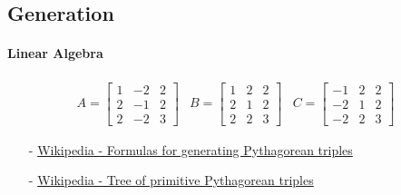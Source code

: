 \documentclass[a4paper]{report}
\begin{document}
\subsection{Generation}

\paragraph{Linear Algebra}

\begin{equation}
    \begin{array}{lcr}
    A = \begin{bmatrix} 1 & -2 & 2 \\ 2 & -1 & 2 \\ 2 & -2 & 3 \end{bmatrix} &
    B = \begin{bmatrix} 1 & 2 & 2 \\ 2 & 1 & 2 \\ 2 & 2 & 3 \end{bmatrix} &
    C = \begin{bmatrix} -1 & 2 & 2 \\ -2 & 1 & 2 \\ -2 & 2 & 3 \end{bmatrix}
    \end{array}
\end{equation}

\begin{itemize}
    \item[-]\href{http://en.wikipedia.org/wiki/Formulas_for_generating_Pythagorean_triples}{Wikipedia - Formulas for generating Pythagorean triples}
    \item[-]\href{http://en.wikipedia.org/wiki/Tree_of_primitive_Pythagorean_triples}{Wikipedia - Tree of primitive Pythagorean triples}
\end{itemize}
\end{document}
